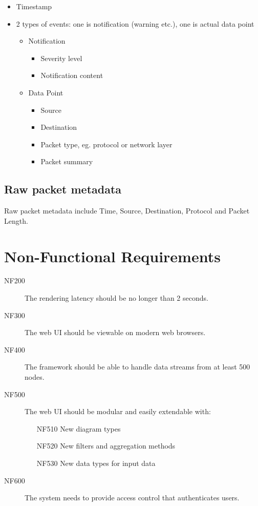 \documentclass[twoside, english, draft]{Pflichtenheft}
\begin{document}
	\begin{itemize}
		\item Timestamp
		\item 2 types of events: one is notification (warning etc.), one is actual data point
			\begin{itemize}
				\item Notification
				\begin{itemize}
					\item Severity level
					\item Notification content
				\end{itemize}
				\item Data Point
				\begin{itemize}
					\item Source
					\item Destination
					\item Packet type, eg. protocol or network layer
					\item Packet summary
				\end{itemize}
			\end{itemize}
	\end{itemize}

\subsection{Raw packet metadata}
\begin{description}
    \item
	Raw packet metadata include Time, Source, Destination, Protocol and Packet Length.
\end{description}

\section{Non-Functional Requirements}

\begin{description}

  \item[NF200]
  The rendering latency should be no longer than 2 seconds.

  \item[NF300]
  The web UI should be viewable on modern web browsers.

  \item[NF400]
  The framework should be able to handle \glspl{data stream} from at least 500 nodes.

  \item[NF500]
	The web UI should be modular and easily extendable with:
	\begin{itemize}
		\item[NF510]{New diagram types}
		\item[NF520]{New filters and aggregation methods}
		\item[NF530]{New data types for input data}
	\end{itemize}

  \item[NF600]
  The system needs to provide access control that authenticates users.

	  
\end{description}
\end{document}
